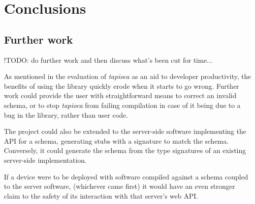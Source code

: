 \section{Conclusions} \label{concl}




\subsection{Further work} \label{concl:further}

!TODO: do further work and then discuss what's been cut for time...

As mentioned in the evaluation of \emph{tapioca} as an aid to developer productivity,  the benefits of using the library quickly erode when it starts to go wrong. Further work could provide the user with straightforward means to correct an invalid schema, or to stop \emph{tapioca} from failing compilation in case of it being due to a bug in the library, rather than user code.

The project could also be extended to the server-side software implementing the API for a schema, generating stubs with a signature to match the schema. Conversely, it could generate the schema from the type signatures of an existing server-side implementation.

If a device were to be deployed with software compiled against a schema coupled to the server software, (whichever came first) it would have an even stronger claim to the safety of its interaction with that server's web API.